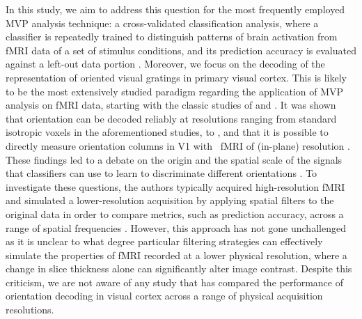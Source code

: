 In this study, we aim to address this question for the most frequently employed
MVP analysis technique: a cross-validated classification analysis, where a
classifier is repeatedly trained to distinguish patterns of brain activation
from fMRI data of a set of stimulus conditions, and its prediction accuracy is
evaluated against a left-out data portion \citep{pereira_2009}. Moreover, we
focus on the decoding of the representation of oriented visual gratings in
primary visual cortex. This is likely to be the most extensively studied
paradigm regarding the application of MVP analysis on fMRI data, starting with
the classic studies of  \citet{kamitani_2005} and \citet{haynes_2005}. It was
shown that orientation can be decoded reliably at resolutions ranging from
standard  isotropic voxels in the aforementioned studies, to 
\citep{swisher_2010}, and that it is possible to directly measure orientation
columns in V1 with \sevenT\ fMRI of  (in-plane) resolution
\citep{yacoub_2008,ugurbil_2012}. These findings led to a debate on the origin
and the spatial scale of the signals that classifiers can use to learn to
discriminate different orientations
\citep{opdebeeck_2010,swisher_2010,alink_2013,freeman_2013}. To investigate
these questions, the authors typically acquired high-resolution fMRI and
simulated a lower-resolution acquisition by applying spatial filters to the
original data in order to compare metrics, such as prediction accuracy, across
a range of spatial frequencies \citep[see][]{swisher_2010}.  However, this
approach has not gone unchallenged as it is unclear to what degree particular
filtering strategies \citep[e.g. Gaussian filtering vs. low-pass filtering in
the spatial frequency domain, see][]{misaki_2013} can effectively simulate the
properties of fMRI recorded at a lower physical resolution, where a change in
slice thickness alone can significantly alter image contrast. Despite this
criticism, we are not aware of any study that has compared the performance of
orientation decoding in visual cortex across a range of physical acquisition
resolutions.

